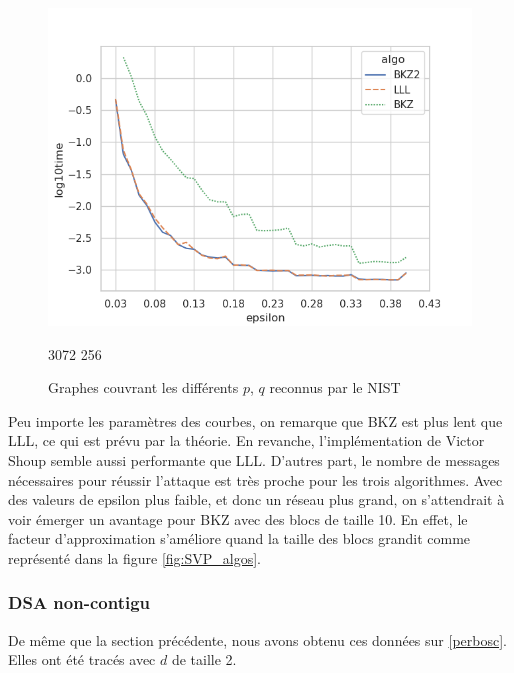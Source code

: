 \documentclass{backend}
\begin{document}
\begin{figure}[H]
\begin{minipage}{0.45\textwidth}
        \centering
        \includegraphics[width=\textwidth]{img/contigu/3072_256_mint_maxm_epsi_time_log.png}
        \caption{3072 256}
        \label{fig:image3}
    \end{minipage}
    \caption{Graphes couvrant les différents $p$, $q$ reconnus par le NIST}
    \label{fig:contigu}
\end{figure}

Peu importe les paramètres des courbes, on remarque que BKZ est plus lent que LLL, ce qui est prévu par la théorie. En revanche, l'implémentation de Victor Shoup \cite{NTL} semble aussi performante que LLL.\smallbreak
D'autres part, le nombre de messages nécessaires pour réussir l'attaque est très proche pour les trois algorithmes.
Avec des valeurs de epsilon plus faible, et donc un réseau plus grand, on s'attendrait à voir émerger un avantage pour BKZ avec des blocs de taille 10. En effet, le facteur d'approximation s'améliore quand la taille des blocs grandit comme représenté dans la figure \ref{fig:SVP_algos}.

\newpage
\subsubsection{DSA non-contigu}

De même que la section précédente, nous avons obtenu ces données sur \ref{perbosc}. Elles ont été tracés avec $d$ de taille 2.
\end{document}
